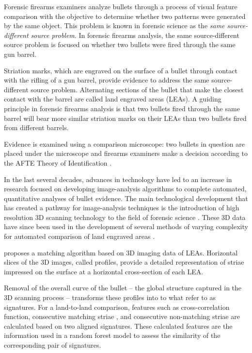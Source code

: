 \documentclass[]{article}
\begin{document}
Forensic firearms examiners analyze bullets through a process of visual
feature comparison with the objective to determine whether two patterns
were generated by the same object. This problem is known in forensic
science as the \emph{same source-different source problem}. In forensic
firearms analysis, the same source-different source problem is focused
on whether two bullets were fired through the same gun barrel.

Striation marks, which are engraved on the surface of a bullet through
contact with the rifling of a gun barrel, provide evidence to address
the same source-different source problem. Alternating sections of the
bullet that make the closest contact with the barrel are called land
engraved areas (LEAs). A guiding principle in forensic firearms analysis
is that two bullets fired through the same barrel will bear more similar
striation marks on their LEAs than two bullets fired from different
barrels.

Evidence is examined using a comparison microscope: two bullets in
question are placed under the microscope and firearms examiners make a
decision according to the AFTE Theory of Identification \citep{AFTE}.

In the last several decades, advances in technology have led to an
increase in research focused on developing image-analysis algorithms to
complete automated, quantitative analyses of bullet evidence. The main
technological development that has created a pathway for image-analysis
techniques is the introduction of high resolution 3D scanning technology
to the field of forensic science
\citep[e.g.~][]{DeKinder1, DeKinder2, Bachrach1}. These 3D data have
since been used in the development of several methods of varying
complexity for automated comparison of land engraved areas
\citep[e.g.~][]{Ma1, Chu1, Chu2, Hare1}.

\citet{Hare1} proposes a matching algorithm based on 3D imaging data of
LEAs. Horizontal slices of the 3D images, called profiles, provide a
detailed representation of striae impressed on the surface at a
horizontal cross-section of each LEA.

Removal of the overall curve of the bullet -- the global structure
captured in the 3D scanning process -- transforms these profiles into to
what \citet{Hare1} refer to as signatures. For a land-to-land
comparison, features such as cross-correlation function, consecutive
matching striae \citep[see][]{Biasotti}, and consecutive non-matching
striae are calculated based on two aligned signatures. These calculated
features are the information used in a random forest model to assess the
similarity of the corresponding pair of signatures.
\end{document}
